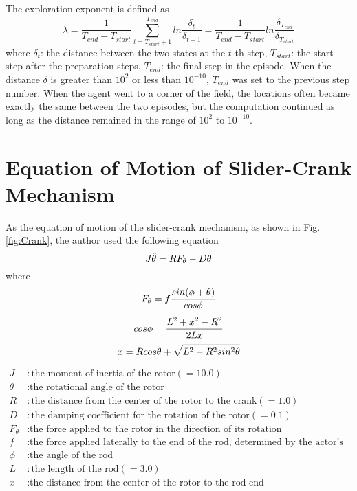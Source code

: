 The exploration exponent is defined as 
\begin{equation}
\lambda = \frac{1}{T_{end}-T_{start}}\sum_{t=T_{start}+1}^{T_{end}} ln \frac{\delta_{t}}{\delta_{t-1}}
=\frac{1}{T_{end}-T_{start}}ln\frac{\delta_{T_{end}}}{\delta_{T_{start}}}
\end{equation}
where $\delta_t$:  the distance between the two states at the $t$-th step, $T_{start}$: the start step
after the preparation steps, $T_{end}$: the final step in the episode.
When the distance $\delta$ is greater than $10^2$ or less than $10^{-10}$,
$T_{end}$ was set to the previous step number.
When the agent went to a corner of the field, the locations often became exactly the same
between the two episodes,
but the computation continued as long as the distance remained in the range of $10^2$ to $10^{-10}$.

\section{Equation of Motion of Slider-Crank Mechanism}\label{App:Eq_Crank}
As the equation of motion of the slider-crank mechanism, as shown in Fig. \ref{fig:Crank},
the author used the following equation
\begin{equation}
J\ddot{\theta} = RF_{\theta} - D\dot{\theta}\\
\end{equation}
where
\begin{equation}
F_{\theta} = f \frac{sin(\phi+\theta)}{cos\phi}\\
\end{equation}
\begin{equation}
cos\phi = \frac{L^2+x^2-R^2}{2Lx}\\
\end{equation}
\begin{equation}
x = Rcos\theta + \sqrt{L^2 - R^2sin^2\theta}\\
\end{equation}


\begin{align}
J&: \text{the moment of inertia of the rotor} (=10.0)\nonumber \\
\theta&: \text{the rotational angle of the rotor}\nonumber \\
R&: \text{the distance from the center of the rotor to the crank} (=1.0)\nonumber \\
D&: \text{the damping coefficient for the rotation of the rotor} (=0.1)\nonumber \\
F_{\theta}&: \text{the force applied to the rotor in the direction of its rotation}\nonumber \\
f &: \text{the force applied laterally to the end of the rod, determined by the actor's outputs}\nonumber \\
\phi&: \text{the angle of the rod}\nonumber \\
L&: \text{the length of the rod} (=3.0)\nonumber \\
x&: \text{the distance from the center of the rotor to the rod end}\nonumber
\end{align}


